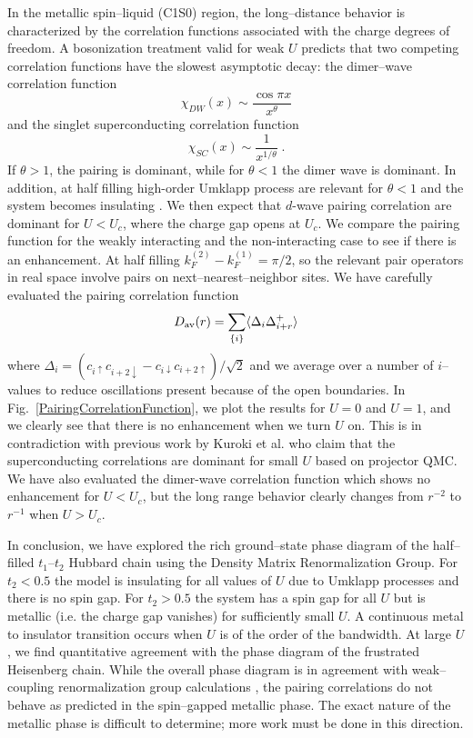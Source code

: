 In the metallic spin--liquid (C1S0) region, the long--distance behavior is
characterized by the correlation functions associated with the
charge degrees of freedom.
A bosonization treatment valid for weak $U$ \cite{Fabrizio96} predicts
that two competing correlation functions have the slowest asymptotic decay: 
the dimer--wave correlation function
\begin{equation}
 \chi_{DW} (x)   \sim \frac{\cos \pi x}{x^\theta}
\end{equation}
%
and the singlet superconducting  correlation function 
\begin{equation}
  \chi_{SC}(x)   \sim \frac{1}{x^{1/\theta}} \; .
\end{equation}
If $\theta>1$, the pairing is dominant, 
while for $\theta<1$ the dimer wave is dominant. 
In addition, at half filling high-order Umklapp process are relevant
for $\theta < 1$ and the system becomes insulating \cite{Fabrizio96}.
We then expect that $d$-wave pairing correlation are dominant for
$U < U_c$, where the charge gap opens at $U_c$.
We compare the pairing function for the weakly interacting and 
the non-interacting case to see if there is an enhancement.
At half filling $k_F^{(2)} - k_F^{(1)} = \pi / 2$, so the relevant pair 
operators in real space involve pairs on next--nearest--neighbor sites. 
We have carefully evaluated the pairing correlation function  
\begin{equation}
    D_{\rm av}(r) = \sum_{\{i\}} \langle \Delta_i \Delta_{i+r}^+ \rangle
\end{equation}
where 
$\Delta_i = (c_{i\uparrow}c_{i+2\downarrow} 
- c_{i\downarrow}c_{i+2\uparrow}) / \sqrt{2} $
and we average over a number of $i$--values to
reduce oscillations present because of the open boundaries.
In Fig.\ \ref{PairingCorrelationFunction}, we plot the results for $U=0$ and 
$U=1$, and we clearly see that there is no enhancement when we turn $U$ on.
This is in contradiction with previous work by Kuroki et al. \cite{Kuroki97} 
who claim that the superconducting correlations are dominant for small $U$ 
based on projector QMC. 
We have also evaluated the dimer-wave correlation function which shows no 
enhancement for $U < U_c$, but the long range behavior clearly changes 
from $r^{-2}$ to $r^{-1}$ when $U > U_c$.

In conclusion, we have explored the rich ground--state phase diagram of the
half--filled  $t_1$--$t_2$ Hubbard chain using the Density Matrix
Renormalization Group.
For $t_2 < 0.5 $ the model is insulating for 
all values of $U$ due to Umklapp processes and there is no spin gap. 
For $t_2 > 0.5$ the system has a spin gap for all $U$ but is metallic
(i.e. the charge gap vanishes) for sufficiently small $U$.
A continuous metal to insulator transition occurs when $U$ is of the order 
of the bandwidth.
At large $U$, we find quantitative agreement with the phase diagram of
the frustrated Heisenberg chain.
While the overall phase diagram is in agreement with weak--coupling
renormalization group calculations \cite{Fabrizio96}, the pairing 
correlations do not behave as predicted in the
spin--gapped metallic phase.
The exact nature of the metallic phase is difficult to determine;
more work must be done in this direction.

